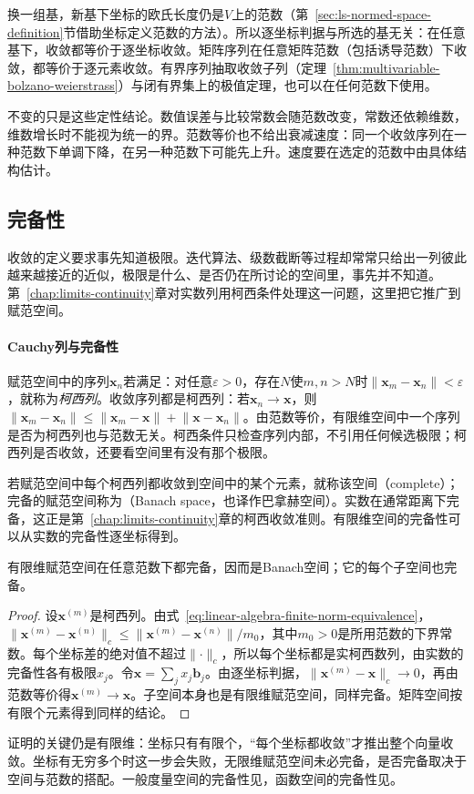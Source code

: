 换一组基，新基下坐标的欧氏长度仍是$V$上的范数（第~\ref{sec:ls-normed-space-definition}节借助坐标定义范数的方法）。所以逐坐标判据与所选的基无关：在任意基下，收敛都等价于逐坐标收敛。矩阵序列在任意矩阵范数（包括诱导范数）下收敛，都等价于逐元素收敛。有界序列抽取收敛子列（定理~\ref{thm:multivariable-bolzano-weierstrass}）与闭有界集上的极值定理，也可以在任何范数下使用。

不变的只是这些定性结论。数值误差与比较常数会随范数改变，常数还依赖维数，维数增长时不能视为统一的界。范数等价也不给出衰减速度：同一个收敛序列在一种范数下单调下降，在另一种范数下可能先上升。速度要在选定的范数中由具体结构估计。

\subsection{完备性}
\label{sec:ls-banach-spaces}

收敛的定义要求事先知道极限。迭代算法、级数截断等过程却常常只给出一列彼此越来越接近的近似，极限是什么、是否仍在所讨论的空间里，事先并不知道。第~\ref{chap:limits-continuity}章对实数列用柯西条件处理这一问题，这里把它推广到赋范空间。

\paragraph{Cauchy列与完备性}
赋范空间中的序列$\bm x_n$若满足：对任意$\varepsilon>0$，存在$N$使$m,n>N$时$\lVert\bm x_m-\bm x_n\rVert<\varepsilon$，就称为\emph{柯西列}。收敛序列都是柯西列：若$\bm x_n\to\bm x$，则$\lVert\bm x_m-\bm x_n\rVert\leq\lVert\bm x_m-\bm x\rVert+\lVert\bm x-\bm x_n\rVert$。由范数等价，有限维空间中一个序列是否为柯西列也与范数无关。柯西条件只检查序列内部，不引用任何候选极限；柯西列是否收敛，还要看空间里有没有那个极限。

若赋范空间中每个柯西列都收敛到空间中的某个元素，就称该空间（complete）；完备的赋范空间称为（Banach space，也译作巴拿赫空间）。实数在通常距离下完备，这正是第~\ref{chap:limits-continuity}章的柯西收敛准则。有限维空间的完备性可以从实数的完备性逐坐标得到。
\begin{theorem}[有限维赋范空间的完备性]
\label{thm:ls-finite-dimensional-complete}
有限维赋范空间在任意范数下都完备，因而是Banach空间；它的每个子空间也完备。
\end{theorem}
\begin{proof}
设$\bm x^{(m)}$是柯西列。由式~\eqref{eq:linear-algebra-finite-norm-equivalence}，$\lVert\bm x^{(m)}-\bm x^{(n)}\rVert_c\leq\lVert\bm x^{(m)}-\bm x^{(n)}\rVert/m_0$，其中$m_0>0$是所用范数的下界常数。每个坐标差的绝对值不超过$\lVert\cdot\rVert_c$，所以每个坐标都是实柯西数列，由实数的完备性各有极限$x_j$。令$\bm x=\sum_jx_j\bm b_j$。由逐坐标判据，$\lVert\bm x^{(m)}-\bm x\rVert_c\to0$，再由范数等价得$\bm x^{(m)}\to\bm x$。子空间本身也是有限维赋范空间，同样完备。矩阵空间按有限个元素得到同样的结论。
\end{proof}
证明的关键仍是有限维：坐标只有有限个，“每个坐标都收敛”才推出整个向量收敛。坐标有无穷多个时这一步会失败，无限维赋范空间未必完备，是否完备取决于空间与范数的搭配。一般度量空间的完备性见，函数空间的完备性见。

